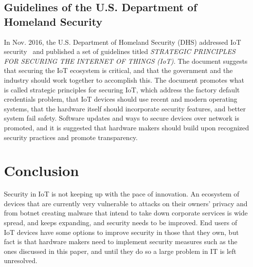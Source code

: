 \documentclass[a4paper, conference]{IEEEtran/IEEEtran}
\begin{document}
\subsection{Guidelines of the U.S. Department of Homeland Security}
In Nov. 2016, the U.S. Department of Homeland Security (DHS) addressed IoT security~\cite{dhssite} and published a set of guidelines titled \textit{STRATEGIC PRINCIPLES FOR SECURING THE INTERNET OF THINGS (IoT)}.\cite{dhsdoc} The document suggests that securing the IoT ecosystem is critical, and that the government and the industry should work together to accomplish this. The document promotes what is called strategic principles for securing IoT, which address the factory default credentials problem, that IoT devices should use recent and modern operating systems, that the hardware itself should incorporate security features, and better system fail safety. Software updates and ways to secure devices over network is promoted, and it is suggested that hardware makers should build upon recognized security practices and promote transparency.

\section{Conclusion}
Security in IoT is not keeping up with the pace of innovation. An ecosystem of devices that are currently very vulnerable to attacks on their owners' privacy and from botnet creating malware that intend to take down corporate services is wide spread, and keeps expanding, and security needs to be improved. End users of IoT devices have some options to improve security in those that they own, but fact is that hardware makers need to implement security measures such as the ones discussed in this paper, and until they do so a large problem in IT is left unresolved. 


\end{document}
